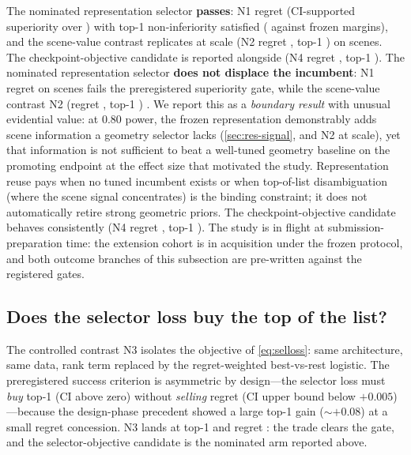 \iffnonedone
\iffnonepass
The nominated representation selector \textbf{passes}: N1 regret \NOneKEightRegretCI{} (CI-supported superiority over \Lgeo) with top-1 non-inferiority satisfied (\NOneKEightTopOneCI{} against frozen margins), and the scene-value contrast replicates at scale (N2 regret \NTwoKEightRegretCI, top-1 \NTwoKEightTopOneCI) on \FnOneNScenes{} scenes.
The checkpoint-objective candidate is reported alongside (N4 regret \NFourKEightRegretCI, top-1 \NFourKEightTopOneCI).
\else
The nominated representation selector \textbf{does not displace the incumbent}: N1 regret \NOneKEightRegretCI{} on \FnOneNScenes{} scenes fails the preregistered superiority gate, while the scene-value contrast N2 (regret \NTwoKEightRegretCI, top-1 \NTwoKEightTopOneCI) .
We report this as a \emph{boundary result} with unusual evidential value: at $0.80$ power, the frozen representation demonstrably adds scene information a geometry selector lacks (\cref{sec:res-signal}, and N2 at scale), yet that information is not sufficient to beat a well-tuned geometry baseline on the promoting endpoint at the effect size that motivated the study.
Representation reuse pays when no tuned incumbent exists or when top-of-list disambiguation (where the scene signal concentrates) is the binding constraint; it does not automatically retire strong geometric priors.
The checkpoint-objective candidate behaves consistently (N4 regret \NFourKEightRegretCI, top-1 \NFourKEightTopOneCI).
\fi
\else
The study is in flight at submission-preparation time: the extension cohort is in acquisition under the frozen protocol, and both outcome branches of this subsection are pre-written against the registered gates. 
\fi

\subsection{Does the selector loss buy the top of the list?}
\label{sec:res-selloss}

The controlled contrast N3 isolates the objective of \cref{eq:selloss}: same architecture, same data, rank term replaced by the regret-weighted best-vs-rest logistic.
The preregistered success criterion is asymmetric by design---the selector loss must \emph{buy} top-1 (CI above zero) without \emph{selling} regret (CI upper bound below $+0.005$)---because the design-phase precedent showed a large top-1 gain (${\sim}{+}0.08$) at a small regret concession.
\iffnonedone
N3 lands at top-1 \NThreeKEightTopOneCI{} and regret \NThreeKEightRegretCI: \iffnonepass the trade clears the gate, and the selector-objective candidate is the nominated arm reported above.\else\ \fi
\else
\fnpending
\fi

